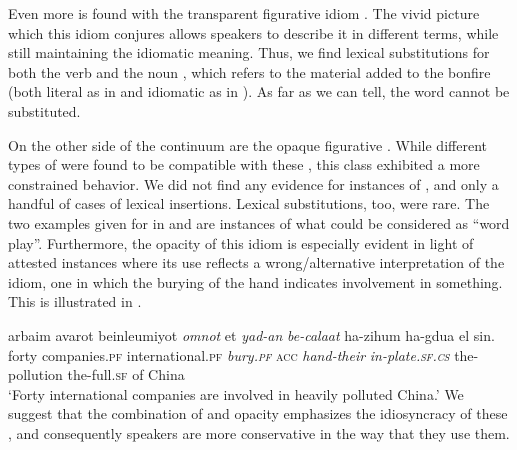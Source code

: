 \documentclass[output=paper]{langsci/langscibook}
\begin{document}
Even more  is found with the transparent figurative idiom . The vivid picture which this idiom conjures allows speakers to describe it in different terms, while still maintaining the idiomatic meaning. Thus, we find lexical substitutions for both the verb  and the noun , which refers to the material added to the bonfire (both literal as in  and idiomatic as in ). As far as we can tell, the word  cannot be substituted.

On the other side of the  continuum are the opaque figurative . While different types of  were found to be compatible with these , this class exhibited a more constrained behavior. We did not find any evidence for instances of , and only a handful of cases of lexical insertions. Lexical substitutions, too, were rare. The two examples given for  in  and  are instances of what could be considered as ``word play''. Furthermore, the opacity of this idiom is especially evident in light of attested instances where its use reflects a wrong\slash alternative interpretation of the idiom, one in which the burying of the hand indicates involvement in something. This is illustrated in .

	\ea\label{she:taman-wrong}
    	\gll {\alef}arba{\ayin}im {\het}avarot beinle{\alef}umiyot \textit{{\tet}omnot} {\alef}et \textit{yad-an} \textit{be-cala{\het}at} ha-zihum ha-gdu{\shin}a {\shin}el sin.\\
    	   forty companies.\textsc{pf} international.\textsc{pf} \textit{bury.\textsc{pf}} \textsc{acc} \textit{hand-their} \textit{in-plate.\textsc{sf.cs}} the-pollution the-full.\textsc{sf} of China\\
    	\glt `Forty  international companies are involved in heavily polluted China.'
	\z
We suggest that the combination of  and opacity emphasizes the idiosyncracy of these , and consequently speakers are more conservative in the way that they use them.
\end{document}
